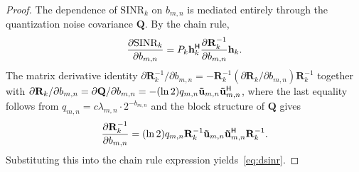 \documentclass[10pt, twocolumn, comsoc]{IEEEtran}
\begin{document}
\begin{proof}
The dependence of $\mathrm{SINR}_k$ on $b_{m,n}$ is 
mediated entirely through the quantization noise 
covariance $\mathbf{Q}$. By the chain rule,
\begin{align}
  \frac{\partial \mathrm{SINR}_k}{\partial b_{m,n}} 
  = P_k \mathbf{h}_k^{\sf H} 
    \frac{\partial \mathbf{R}_k^{-1}}
         {\partial b_{m,n}} \mathbf{h}_k.
\end{align}
The matrix derivative identity 
$\partial \mathbf{R}_k^{-1}/\partial b_{m,n} 
= -\mathbf{R}_k^{-1} (\partial \mathbf{R}_k/
\partial b_{m,n}) \mathbf{R}_k^{-1}$ together with 
$\partial \mathbf{R}_k/\partial b_{m,n} 
= \partial \mathbf{Q}/\partial b_{m,n} 
= -(\ln 2) q_{m,n} \mathbf{\tilde u}_{m,n} \mathbf{\tilde u}_{m,n}^{\sf H}$, where the last equality follows from $q_{m,n} = c \lambda_{m,n} \cdot 2^{-b_{m,n}}$ and the block structure of $\mathbf{Q}$ gives
\begin{align}
  \frac{\partial \mathbf{R}_k^{-1}}{\partial b_{m,n}} 
  = (\ln 2) q_{m,n} \mathbf{R}_k^{-1} 
    \mathbf{\tilde u}_{m,n} \mathbf{\tilde u}_{m,n}^{\sf H} 
    \mathbf{R}_k^{-1}.
\end{align}
Substituting this into the chain rule expression 
yields~\eqref{eq:dsinr}.
\end{proof}
\end{document}
